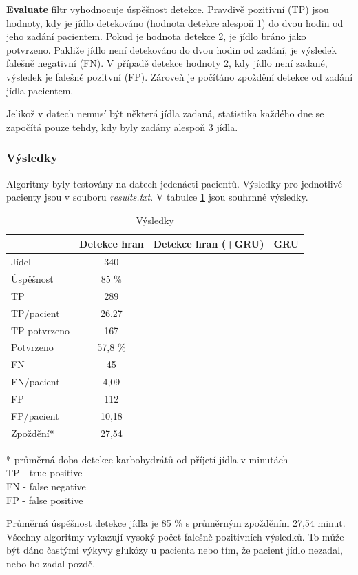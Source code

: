 \textbf{Evaluate} filtr vyhodnocuje úspěšnost detekce. Pravdivě pozitivní (TP) jsou hodnoty, kdy je jídlo detekováno (hodnota detekce alespoň 1) do dvou hodin od jeho zadání pacientem. Pokud je hodnota detekce 2, je jídlo bráno jako potvrzeno. Pakliže jídlo není detekováno do dvou hodin od zadání, je výsledek falešně negativní (FN). V případě detekce hodnoty 2, kdy jídlo není zadané, výsledek je falešně pozitvní (FP). Zároveň je počítáno zpoždění detekce od zadání jídla pacientem.

Jelikož v datech nemusí být některá jídla zadaná, statistika každého dne se započítá pouze tehdy, kdy byly zadány alespoň 3 jídla.

\subsubsection{Výsledky}

Algoritmy byly testovány na datech jedenácti pacientů. Výsledky pro jednotlivé pacienty jsou v souboru \textit{results.txt}. V tabulce \ref{tab:results} jsou souhrnné výsledky.

\begin{table}[H]
\caption{Výsledky}
\label{tab:results}
\centering
\begin{tabular}{|l|c|c|c|}
\hline 
& \textbf{Detekce hran} & \textbf{Detekce hran (+GRU)} & \textbf{ GRU }\\
\hline 
\hline 
Jídel & 340 &  &  \\\hline
Úspěšnost & 85 \% &  &  \\\hline
TP & 289 &  &  \\\hline
TP/pacient & 26,27 &  &  \\\hline
TP potvrzeno & 167 &  &  \\\hline
Potvrzeno & 57,8 \% &  &  \\\hline
FN & 45 &  &  \\\hline
FN/pacient & 4,09 &  &  \\\hline
FP & 112 &  &  \\\hline
FP/pacient & 10,18 &  &  \\\hline
Zpoždění* & 27,54 &  &  \\
\hline
\end{tabular}
\begin{flushleft}
* průměrná doba detekce karbohydrátů od příjetí jídla v minutách\\
TP - true positive\\
FN - false negative\\
FP - false positive\\
\end{flushleft}
\end{table}

Průměrná úspěšnost detekce jídla je 85 \% s průměrným zpožděním 27,54 minut. Všechny algoritmy vykazují vysoký počet falešně pozitivních výsledků. To může být dáno častými výkyvy glukózy u pacienta nebo tím, že pacient jídlo nezadal, nebo ho zadal pozdě.